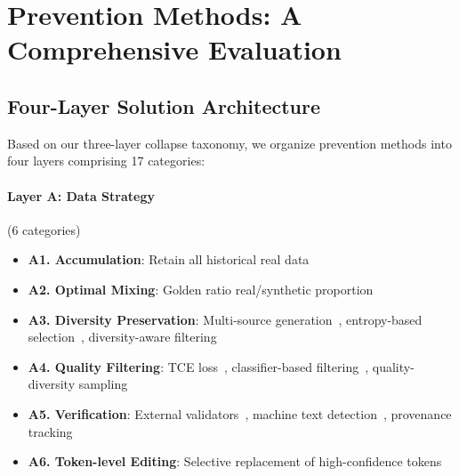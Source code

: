 \documentclass[11pt]{article}
\begin{document}
\section{Prevention Methods: A Comprehensive Evaluation}
\label{sec:prevention}

\subsection{Four-Layer Solution Architecture}

Based on our three-layer collapse taxonomy, we organize prevention methods into four layers comprising 17 categories:

\paragraph{Layer A: Data Strategy} (6 categories)
\begin{itemize}[nosep]
    \item \textbf{A1. Accumulation}: Retain all historical real data~\citep{gerstgrasser2024model}
    \item \textbf{A2. Optimal Mixing}: Golden ratio real/synthetic proportion~\citep{golden2025}
    \item \textbf{A3. Diversity Preservation}: Multi-source generation~\citep{syntheggs2025}, entropy-based selection~\citep{martinez2025closer}, diversity-aware filtering~\citep{diversity2024,divemethod2025,quadmix2025,distmatch2025}
    \item \textbf{A4. Quality Filtering}: TCE loss~\citep{fortifai2025}, classifier-based filtering~\citep{finerweb2025,ultrafineweb2025}, quality-diversity sampling~\citep{qd2023}
    \item \textbf{A5. Verification}: External validators~\citep{escaping2025}, machine text detection~\citep{detection2025}, provenance tracking~\citep{provenance2025}
    \item \textbf{A6. Token-level Editing}: Selective replacement of high-confidence tokens~\citep{zhu2024toedit}
\end{itemize}
\end{document}
